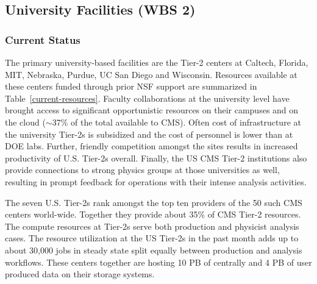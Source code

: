 \documentclass[11pt,a4paper]{article}
\begin{document}

\subsection{University Facilities (WBS 2)}

\subsubsection{Current Status}

The primary university-based facilities are the Tier-2 centers at Caltech,
Florida, MIT, Nebraska, Purdue, UC San Diego and Wisconsin.  Resources
available at these centers funded through prior NSF support are summarized
in Table~\ref{current-resources}.  Faculty collaborations at the university
level have brought access to significant opportunistic resources on their
campuses and on the cloud ($\sim$37\% of the total available to CMS).  Often
cost of infrastructure at the university Tier-2s is subsidized and the cost
of personnel is lower than at DOE labs.  Further, friendly competition amongst the
sites results in increased productivity of U.S. Tier-2s overall.  
Finally, the US CMS Tier-2 institutions also provide connections to strong
physics groups at those universities as well, resulting in prompt feedback
for operations with their intense analysis activities.

The seven
U.S. Tier-2s rank amongst the top ten providers of the 50 such CMS centers
world-wide. Together they provide about 35\% of CMS Tier-2 resources.  The
compute resources at Tier-2s serve both production and physicist analysis
cases.  The resource utilization at the US Tier-2s in the past month adds
up to about 30,000 jobs in steady state split equally between production
and analysis workflows.  These centers together are hosting 10 PB of 
centrally and 4 PB of user produced data on their storage systems.
\end{document}
